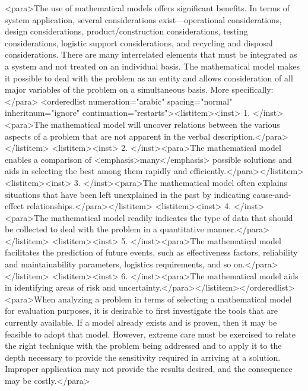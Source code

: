 <para>The use of mathematical models offers significant benefits. In terms of system application, several considerations exist—operational considerations, design considerations, product/construction considerations, testing considerations, logistic support considerations, and recycling and disposal considerations. There are many interrelated elements that must be integrated as a system and not treated on an individual basis. The mathematical model makes it possible to deal with the problem as an entity and allows consideration of all major variables of the problem on a simultaneous basis. More specifically:</para>
<orderedlist numeration="arabic" spacing="normal" inheritnum="ignore" continuation="restarts"><listitem><inst>	1.	</inst><para>The mathematical model will uncover relations between the various aspects of a problem that are not apparent in the verbal description.</para></listitem>
<listitem><inst>	2.	</inst><para>The mathematical model enables a comparison of <emphasis>many</emphasis> possible solutions and aids in selecting the best among them rapidly and efficiently.</para></listitem>
<listitem><inst>	3.	</inst><para>The mathematical model often explains situations that have been left unexplained in the past by indicating cause-and-effect relationships.</para></listitem>
<listitem><inst>	4.	</inst><para>The mathematical model readily indicates the type of data that should be collected to deal with the problem in a quantitative manner.</para></listitem>
<listitem><inst>	5.	</inst><para>The mathematical model facilitates the prediction of future events, such as effectiveness factors, reliability and maintainability parameters, logistics requirements, and so on.</para></listitem>
<listitem><inst>	6.	</inst><para>The mathematical model aids in identifying areas of risk and uncertainty.</para></listitem></orderedlist>
<para>When analyzing a problem in terms of selecting a mathematical model for evaluation purposes, it is desirable to first investigate the tools that are currently available. If a model already exists and is proven, then it may be feasible to adopt that model. However, extreme care must be exercised to relate the right technique with the problem being addressed and to apply it to the depth necessary to provide the sensitivity required in arriving at a solution. Improper application may not provide the results desired, and the consequence may be costly.</para>

